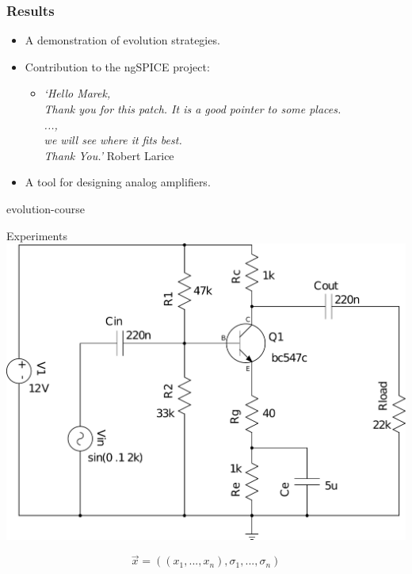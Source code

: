 \documentclass[10pt,xcolor=pdflatex]{beamer}
\begin{document}
\begin{frame}\frametitle{Results}
    \begin{itemize}
        \item A demonstration of evolution strategies. \newline
        \item Contribution to the ngSPICE project:
            \begin{itemize}
                \item \textit{‘Hello Marek,\\
                        Thank you for this patch. It is a good pointer to some places.\\
                        ...,\\
                        we will see where it fits best.\\
                        Thank You.’ \newline}
                        Robert Larice \newline
            \end{itemize}
        \item A tool for designing analog amplifiers.
        \
    \end{itemize}
\end{frame}

 {evolution-course}


\begin{frame}{Experiments}
    \centering
    \includegraphics[scale=0.33]{ce-amplifier-simplified}

     \[
        \vec{x} = ((x_1,...,x_n), \sigma_1,...,\sigma_n)
     \]
\end{frame}
\end{document}
